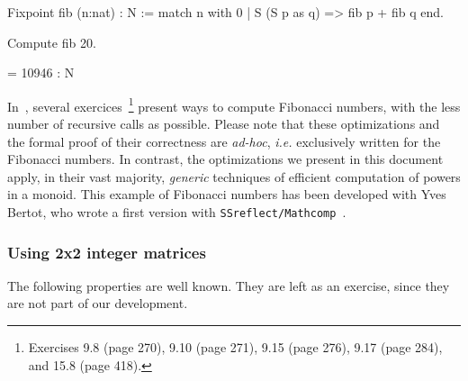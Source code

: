 \begin{Coqsrc}
Fixpoint fib (n:nat) : N :=
  match n with
    0%
  | S (S p as q) => fib p + fib q
  end.

Compute fib 20.
\end{Coqsrc}

\begin{Coqanswer}
= 10946 : N
\end{Coqanswer}

In~\cite{BC04}, several exercices~\footnote{Exercises 9.8 (page 270), 9.10 (page 271), 9.15 (page 276), 9.17 (page 284), and 15.8 (page 418).}  
present ways to compute Fibonacci numbers, with the less number of recursive calls  as possible. Please note that these optimizations and the formal proof of their correctness are \emph{ad-hoc}, \emph{i.e.} exclusively written for the 
Fibonacci numbers.
In contrast, the optimizations we present in this document apply, in their vast majority, \emph{generic} techniques of efficient computation of powers in a monoid. 
This example of Fibonacci numbers has been developed with Yves Bertot, who wrote a first version with \texttt{SSreflect/Mathcomp}~\cite{MCB, SSR}. 


\subsubsection{Using 2x2 integer matrices}

The following properties are well known. They are left as an exercise, since they are not part of our development. 


